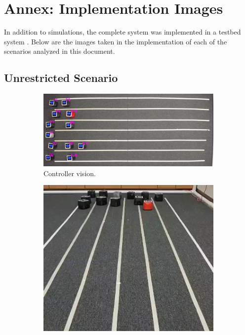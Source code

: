 \begin{appendix}
\label{AnexoA}

\chapter{Annex: Implementation Images}

In addition to simulations, the complete system was implemented in a testbed system \cite{agrobots}. Below are the images taken in the implementation of each of the scenarios analyzed in this document.

\section{Unrestricted Scenario}
\begin{figure}[H]
\centering
\begin{subfigure}[t]{\textwidth}
    \includegraphics[width=\textwidth]{Anexos/no_restricted/no_res_it0_cam0.png}
    \caption{Controller vision.}
    \label{fig:first}
\end{subfigure}
\vspace{1cm}
\begin{subfigure}[b]{0.4\textwidth}
    \includegraphics[width=\textwidth]{Anexos/no_restricted/no_res_it0_cam1.png}

\end{subfigure}
\end{figure}
\end{appendix}
